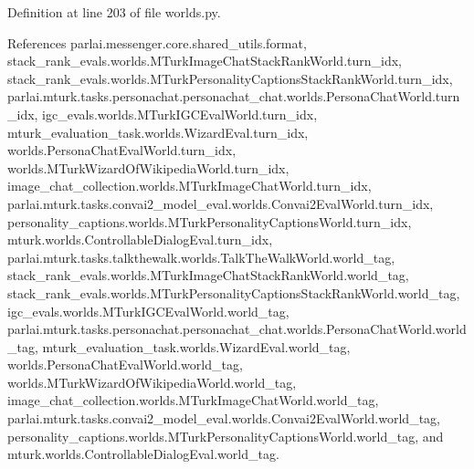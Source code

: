Definition at line 203 of file worlds.\+py.



References parlai.\+messenger.\+core.\+shared\+\_\+utils.\+format, stack\+\_\+rank\+\_\+evals.\+worlds.\+M\+Turk\+Image\+Chat\+Stack\+Rank\+World.\+turn\+\_\+idx, stack\+\_\+rank\+\_\+evals.\+worlds.\+M\+Turk\+Personality\+Captions\+Stack\+Rank\+World.\+turn\+\_\+idx, parlai.\+mturk.\+tasks.\+personachat.\+personachat\+\_\+chat.\+worlds.\+Persona\+Chat\+World.\+turn\+\_\+idx, igc\+\_\+evals.\+worlds.\+M\+Turk\+I\+G\+C\+Eval\+World.\+turn\+\_\+idx, mturk\+\_\+evaluation\+\_\+task.\+worlds.\+Wizard\+Eval.\+turn\+\_\+idx, worlds.\+Persona\+Chat\+Eval\+World.\+turn\+\_\+idx, worlds.\+M\+Turk\+Wizard\+Of\+Wikipedia\+World.\+turn\+\_\+idx, image\+\_\+chat\+\_\+collection.\+worlds.\+M\+Turk\+Image\+Chat\+World.\+turn\+\_\+idx, parlai.\+mturk.\+tasks.\+convai2\+\_\+model\+\_\+eval.\+worlds.\+Convai2\+Eval\+World.\+turn\+\_\+idx, personality\+\_\+captions.\+worlds.\+M\+Turk\+Personality\+Captions\+World.\+turn\+\_\+idx, mturk.\+worlds.\+Controllable\+Dialog\+Eval.\+turn\+\_\+idx, parlai.\+mturk.\+tasks.\+talkthewalk.\+worlds.\+Talk\+The\+Walk\+World.\+world\+\_\+tag, stack\+\_\+rank\+\_\+evals.\+worlds.\+M\+Turk\+Image\+Chat\+Stack\+Rank\+World.\+world\+\_\+tag, stack\+\_\+rank\+\_\+evals.\+worlds.\+M\+Turk\+Personality\+Captions\+Stack\+Rank\+World.\+world\+\_\+tag, igc\+\_\+evals.\+worlds.\+M\+Turk\+I\+G\+C\+Eval\+World.\+world\+\_\+tag, parlai.\+mturk.\+tasks.\+personachat.\+personachat\+\_\+chat.\+worlds.\+Persona\+Chat\+World.\+world\+\_\+tag, mturk\+\_\+evaluation\+\_\+task.\+worlds.\+Wizard\+Eval.\+world\+\_\+tag, worlds.\+Persona\+Chat\+Eval\+World.\+world\+\_\+tag, worlds.\+M\+Turk\+Wizard\+Of\+Wikipedia\+World.\+world\+\_\+tag, image\+\_\+chat\+\_\+collection.\+worlds.\+M\+Turk\+Image\+Chat\+World.\+world\+\_\+tag, parlai.\+mturk.\+tasks.\+convai2\+\_\+model\+\_\+eval.\+worlds.\+Convai2\+Eval\+World.\+world\+\_\+tag, personality\+\_\+captions.\+worlds.\+M\+Turk\+Personality\+Captions\+World.\+world\+\_\+tag, and mturk.\+worlds.\+Controllable\+Dialog\+Eval.\+world\+\_\+tag.

\mbox{\label{classmturk__evaluation__task_1_1worlds_1_1WizardEval_a44b1c6ee341d73d7d749cb940edec47b}} 
